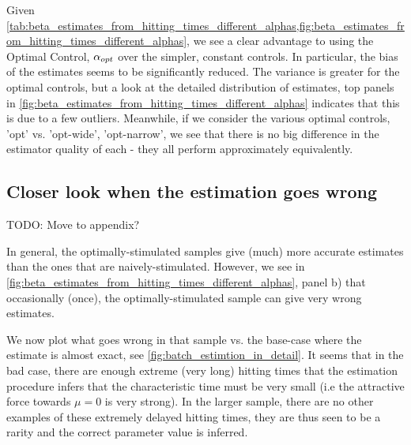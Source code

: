 Given
\cref{tab:beta_estimates_from_hitting_times_different_alphas,fig:beta_estimates_from_hitting_times_different_alphas},
we see a clear advantage to using the Optimal Control, $\alpha_{opt}$ over the
simpler, constant controls. In particular, the bias of the estimates seems to
be significantly reduced. The variance is greater for the optimal controls, but
a look at the detailed distribution of estimates, top panels in
\cref{fig:beta_estimates_from_hitting_times_different_alphas} indicates that
this is due to a few outliers. Meanwhile, if we consider the various optimal
controls, 'opt' vs. 'opt-wide', 'opt-narrow', we see that there is no big
difference in the estimator quality of each - they all perform approximately
equivalently. 


\subsection{Closer look when the estimation goes wrong}
TODO: Move to appendix?

In general, the optimally-stimulated samples give (much) more accurate estimates
than the ones that are naively-stimulated. However, we see in
\cref{fig:beta_estimates_from_hitting_times_different_alphas}, panel b) that
occasionally (once), the optimally-stimulated sample can give very wrong
estimates.

We now plot what goes wrong in that sample vs. the base-case where the estimate
is almost exact, see \cref{fig:batch_estimtion_in_detail}. It seems that in the
bad case, there are enough extreme (very long) hitting times that the estimation
procedure infers that the characteristic time must be very small (i.e the
attractive force towards $\mu=0$ is very strong). In the larger sample, there
are no other examples of these extremely delayed hitting times, they are thus
seen to be a rarity and the correct parameter value is inferred.

